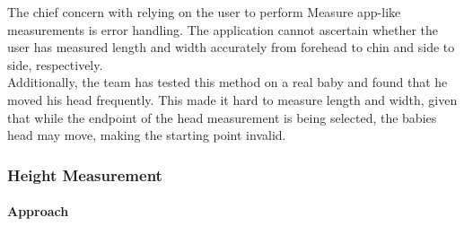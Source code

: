 \documentclass[onecolumn, draftclsnofoot,10pt, compsoc]{IEEEtran}
\begin{document}
The chief concern with relying on the user to perform Measure app-like measurements is error handling. The application cannot ascertain whether the user has measured length and width accurately from forehead to chin and side to side, respectively.\\

Additionally, the team has tested this method on a real baby and found that he moved his head frequently. This made it hard to measure length and width, given that while the endpoint of the head measurement is being selected, the babies head may move, making the starting point invalid.\\

\subsubsection{Height Measurement}

\paragraph{Approach}




\end{document}
